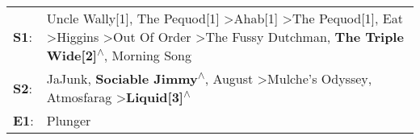 \begin{supertabular}{p{0.03\textwidth}p{0.92\textwidth}}
 \textbf{S1}:  &  Uncle Wally[1]\textsuperscript{}, \enspace The Pequod[1]\textsuperscript{} \textgreater \enspace Ahab[1]\textsuperscript{} \textgreater \enspace The Pequod[1]\textsuperscript{}, \enspace Eat\textsuperscript{} \textgreater \enspace Higgins\textsuperscript{} \textgreater \enspace Out Of Order\textsuperscript{} \textgreater \enspace The Fussy Dutchman\textsuperscript{}, \enspace \textbf{The Triple Wide[2]\textsuperscript{$\wedge$}}, \enspace Morning Song\textsuperscript{}  \enspace  \\
 \textbf{S2}:  &                                                                                                                                                                                                 JaJunk\textsuperscript{}, \enspace \textbf{Sociable Jimmy\textsuperscript{$\wedge$}}, \enspace August\textsuperscript{} \textgreater \enspace Mulche's Odyssey\textsuperscript{}, \enspace Atmosfarag\textsuperscript{} \textgreater \enspace \textbf{Liquid[3]\textsuperscript{$\wedge$}}  \enspace  \\
 \textbf{E1}:  &                                                                                                                                                                                                                                                                                                                                                                                                                                                                  Plunger\textsuperscript{}  \enspace  \\
\end{supertabular}
